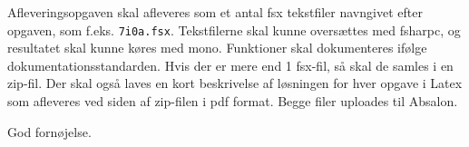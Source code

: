 \documentclass[a4paper,12pt]{article}
\begin{document}
Afleveringsopgaven skal afleveres som et antal fsx tekstfiler navngivet efter opgaven, som f.eks. \lstinline!7i0a.fsx!. Tekstfilerne skal kunne oversættes med fsharpc, og resultatet skal kunne køres med mono. Funktioner skal dokumenteres ifølge dokumentationsstandarden. Hvis der er mere end 1 fsx-fil, så skal de samles i en zip-fil. Der skal også laves en kort beskrivelse af løsningen for hver opgave i Latex som afleveres ved siden af zip-filen i pdf format. Begge filer uploades til Absalon.

\flushright God fornøjelse.
\end{document}
